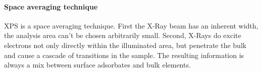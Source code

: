 \paragraph{Space averaging technique}
XPS is a space averaging technique. First the X-Ray beam has an inherent width, the analysis area can't be chosen arbitrarily small. Second, X-Rays do excite electrons not only directly within the illuminated area, but penetrate the bulk and cause a cascade of transitions in the sample. The resulting information is always a mix between surface adsorbates and bulk elements.
